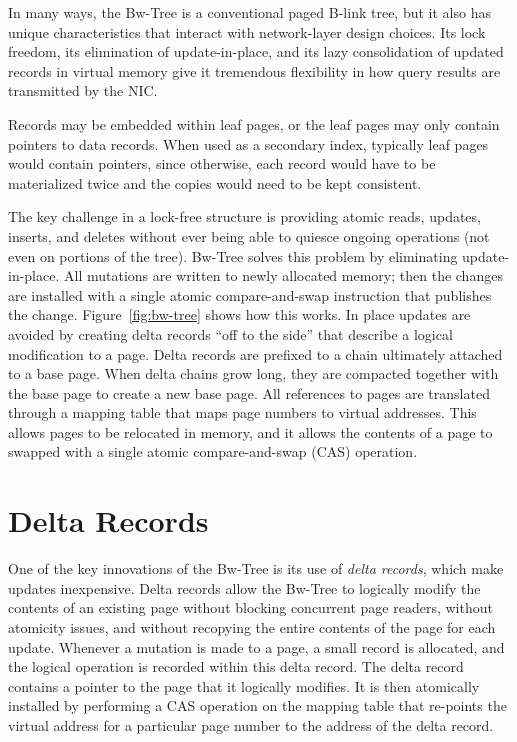 In many ways, the Bw-Tree is a conventional paged B-link tree,
but it also has unique characteristics that interact with network-layer
design choices. Its lock freedom, its elimination of update-in-place,
and its lazy consolidation of updated records in virtual memory give it
tremendous flexibility in how query results are transmitted by the NIC.

Records may be embedded within leaf pages, or the leaf pages may
only contain pointers to data records. When used as a secondary index,
typically leaf pages would contain pointers, since otherwise, each record would
have to be materialized twice and the copies would need to be kept consistent.

The key challenge in a lock-free structure is providing atomic reads, updates,
inserts, and deletes without ever being able to quiesce ongoing operations (not
even on portions of the tree). Bw-Tree solves this problem by eliminating
update-in-place. All mutations are written to newly allocated memory; then
the changes are installed with a single atomic compare-and-swap instruction
that publishes the change.  Figure~\ref{fig:bw-tree} shows how this works.
In place updates are avoided by creating delta records ``off to the side'' 
that describe a logical modification to a page. Delta records are
prefixed to a chain ultimately attached to a base page.  When delta chains
grow long, they are compacted together with the base page to create a new base page.
All references to pages are translated through a mapping table that maps page
numbers to virtual addresses. This allows pages to be relocated in memory, and
it allows the contents of a page to swapped with a single atomic
compare-and-swap (CAS) operation.
\section{Delta Records}
\label{sec:deltarecords}
One of the key innovations of the Bw-Tree is its use of {\em delta records},
which make updates inexpensive.
Delta records allow the Bw-Tree to logically modify the
contents of an existing page without blocking concurrent page readers, without
atomicity issues, and without recopying the entire contents of the page for
each update.  Whenever a mutation is made to a page, a small record is
allocated, and the logical operation is recorded within this delta record. The delta
record contains a pointer to the page that it logically modifies. It
is then atomically installed by performing a CAS operation on the
mapping table that re-points the virtual address for a particular page number
to the address of the delta record.


